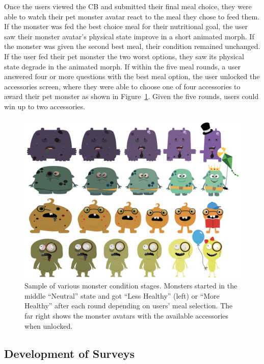Once the users viewed the CB and submitted their final meal choice,
they were able to watch their pet monster avatar react to the meal they chose to feed them. 
If the monster was fed the best choice meal for their nutritional goal, the user saw their monster avatar's physical state improve in a short animated morph. If the monster was given the second best meal, their condition remained unchanged. 
If the user fed their pet monster the two worst options, they saw its physical state degrade in the animated morph. If within the five meal rounds, a user answered four or more questions with the best meal option, the user unlocked the accessories screen, where they were able to choose one of four accessories to award their pet monster as shown in Figure~\ref{fig:monster-stages}. 
Given the five rounds, users could win up to two accessories.

\begin{figure}[h]
\includegraphics[scale=0.25]{samples/images/figure-5.png}
\caption{Sample of various monster condition stages. Monsters started in the middle ``Neutral'' state and got ``Less Healthy'' (left) or ``More Healthy'' after each round depending on users' meal selection. The far right shows the monster avatars with the available accessories when unlocked.}
\label{fig:monster-stages}
\end{figure}



\vspace{-3pt}
\subsection{Development of Surveys}


